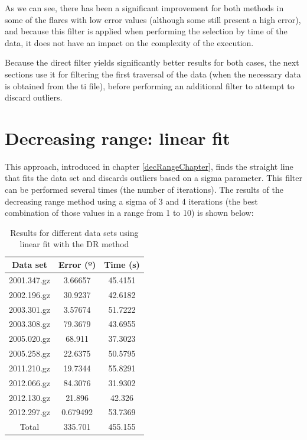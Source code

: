 As we can see, there has been a significant improvement for both methods in some of the flares with low error values (although some still present a high error), and because this filter is applied when performing the selection by time of the data, it does not have an impact on the complexity of the execution. 

Because the direct filter yields significantly better results for both cases, the next sections use it for filtering the first traversal of the data (when the necessary data is obtained from the ti file), before performing an additional filter to attempt to discard outliers.

\clearpage

\section{Decreasing range: linear fit}

This approach, introduced in chapter \ref{decRangeChapter}, finds the straight line that fits the data set and discards outliers based on a sigma parameter. This filter can be performed several times (the number of iterations). The results of the decreasing range method using a sigma of 3 and 4 iterations (the best combination of those values in a range from 1 to 10) is shown below:

\begin{table}[h!]
	\centering
	\def\arraystretch{1.2}
	\begin{tabular}{|c c c|} 
		\hline
		Data set & Error (º) & Time (s) \\ [0.5ex] 
		\hline\hline
		2001.347.gz & 3.66657 & 45.4151 \\
		\hline
		2002.196.gz & 30.9237 & 42.6182 \\
		\hline
		2003.301.gz & 3.57674 & 51.7222 \\
		\hline
		2003.308.gz & 79.3679 & 43.6955 \\
		\hline
		2005.020.gz & 68.911 & 37.3023 \\
		\hline
		2005.258.gz & 22.6375 & 50.5795 \\
		\hline
		2011.210.gz & 19.7344 & 55.8291 \\
		\hline
		2012.066.gz & 84.3076 & 31.9302 \\
		\hline
		2012.130.gz & 21.896 & 42.326 \\
		\hline
		2012.297.gz & 0.679492 & 53.7369 \\
		\hline
		Total & 335.701 & 455.155 \\
		\hline
	\end{tabular}
	\caption{Results for different data sets using linear fit with the DR method}
\end{table}

